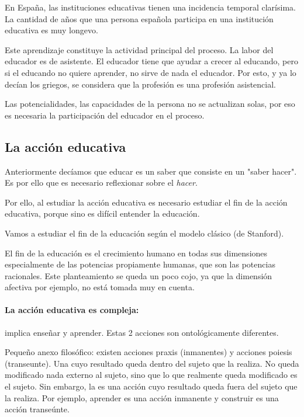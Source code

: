 \documentclass[palatino]{apuntesURJC}
\begin{document}
En España, las instituciones educativas tienen una incidencia temporal clarísima. 
%
La cantidad de años que una persona española participa en una institución educativa es muy longevo.


Este aprendizaje constituye la actividad principal del proceso. 
%
La labor del educador es de asistente. 
%
El educador tiene que ayudar a crecer al educando, pero si el educando no quiere aprender, no sirve de nada el educador.
%
Por esto, y ya lo decían los griegos, se considera que la profesión es una profesión asistencial.

Las potencialidades, las capacidades de la persona no se actualizan solas, por eso es necesaria la participación del educador en el proceso. 

\subsection{La acción educativa}
Anteriormente decíamos que educar es un saber que consiste en un "saber hacer". 
%
Es por ello que es necesario reflexionar sobre el \textit{hacer}.


Por ello, al estudiar la acción educativa es necesario estudiar el fin de la acción educativa, porque sino es difícil entender la educación.

Vamos a estudiar el fin de la educación según el modelo clásico (de Stanford).

El fin de la educación es el crecimiento humano en todas sus dimensiones especialmente de las potencias propiamente humanas, que son las potencias racionales.
%
Este planteamiento se queda un poco cojo, ya que la dimensión afectiva por ejemplo, no está tomada muy en cuenta.

\paragraph{La acción educativa es compleja:} implica enseñar y aprender. 
%
Estas 2 acciones son ontológicamente diferentes.

Pequeño anexo filosófico: existen acciones praxis (inmanentes) y acciones poiesis (transeunte). 
%
Una  cuyo resultado queda dentro del sujeto que la realiza. No queda modificado nada externo al sujeto, sino que lo que realmente queda modificado es el sujeto.
%
Sin embargo, la  es una acción cuyo resultado queda fuera del sujeto que la realiza.
Por ejemplo, aprender es una acción inmanente y construir es una acción transeúnte.
\end{document}
